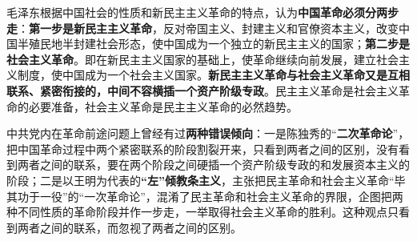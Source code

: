 毛泽东根据中国社会的性质和新民主主义革命的特点，认为\textbf{{中国革命必须分两步走}}：\textbf{{第一步是新民主主义革命}}，反对帝国主义、封建主义和官僚资本主义，改变中国半殖民地半封建社会形态，使中国成为一个独立的新民主主义的国家；\textbf{{第二步是社会主义革命}}。即在新民主主义国家的基础上，使革命继续向前发展，建立社会主义制度，使中国成为一个社会主义国家。\textbf{{新民主主义革命与社会主义革命又是互相联系、紧密衔接的，中间不容横插一个资产阶级专政}}。民主主义革命是社会主义革命的必要准备，社会主义革命是民主主义革命的必然趋势。

{中共党内在革命前途问题上曾经有过}\textbf{{两种错误倾向}}{：一是陈独秀的``}\textbf{{二次革命论}}{''，把中国革命过程中两个紧密联系的阶段割裂开来，只看到两者之间的区别，没有看到两者之间的联系，要在两个阶段之间硬插一个资产阶级专政的和发展资本主义的阶段；二是以王明为代表的}\textbf{{``左''倾教条主义}}{，主张把民主革命和社会主义革命``毕其功于一役''的``一次革命论''，混淆了民主革命和社会主义革命的界限，企图把两种不同性质的革命阶段并作一步走，一举取得社会主义革命的胜利。这种观点只看到两者之间的联系，而忽视了两者之间的区别。}
